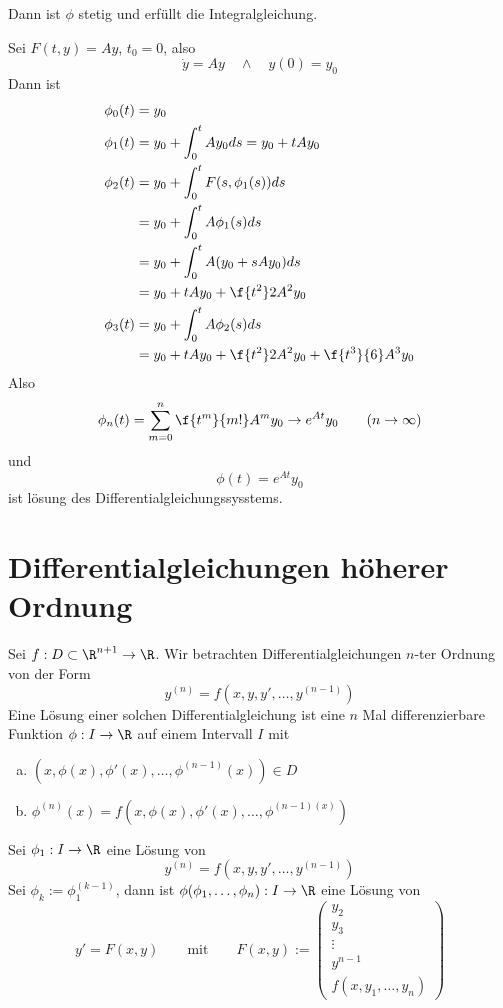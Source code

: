 \documentclass{mycourse}
\begin{document}
Dann ist $\phi$ stetig und erfüllt die Integralgleichung.


\begin{ex*}
	Sei $F(t,y) = Ay$, $t_0=0$, also
	\[
		\dot y = Ay \quad \land \quad y(0) = y_0
	\]
	Dann ist
	\begin{align*}
		\phi_0(t) &= y_0\\
		\phi_1(t) &= y_0 + \int_0^t Ay_0 ds = y_0 + tAy_0\\
		\phi_2(t) &= y_0 + \int_0^t F(s,\phi_1(s)) ds \\
							  &= y_0 + \int_0^t A\phi_1(s) ds\\
					 &=y_0 + \int_0^t A(y_0+sAy_0)ds\\
			   &= y_0 + tAy_0 +\f {t^2}2 A^2y_0\\
		\phi_3(t) &= y_0 + \int_0^t A\phi_2(s) ds\\
									   &= y_0 + tAy_0 + \f{t^2}2 A^2y_0 + \f{t^3}{6} A^3y_0
	\end{align*}
	Also
	\[
		\phi_n(t) = \sum_{m=0}^n\f{t^m}{m!}A^m y_0 \to e^{At}y_0 \qquad (n\to \infty)
	\]
	und
	\[
		\phi(t) = e^{At}y_0
	\]
	ist lösung des Differentialgleichungssysstems.
\end{ex*}


\section{Differentialgleichungen höherer Ordnung}


Sei $f:D\subset \R^{n+1}\to \R$.
Wir betrachten Differentialgleichungen $n$-ter Ordnung von der Form
\[
	y^{(n)} = f(x,y,y',\dotsc,y^{(n-1)})
\]
Eine Lösung einer solchen Differentialgleichung ist eine $n$ Mal differenzierbare Funktion $\phi : I\to \R$ auf einem Intervall $I$ mit
\begin{enumerate}[(a)]
	\item
		$(x,\phi(x),\phi'(x),\dotsc,\phi^{(n-1)}(x)) \in D$
	\item
		$\phi^{(n)}(x) = f(x,\phi(x),\phi'(x), \dotsc, \phi^{(n-1)(x)})$
\end{enumerate}

Sei $\phi_1 : I\to \R$ eine Lösung von
\[
	y^{(n)} = f(x,y,y',\dotsc,y^{(n-1)})
\]
Sei $\phi_k := \phi_1^{(k-1)}$, dann ist $\phi(\phi_1,\dotsc, \phi_n) : I \to \R$ eine Lösung von
\[
	y' = F(x,y) \qquad \text{mit} \qquad F(x,y) := \begin{pmatrix}y_2 \\ y_3 \\\vdots\\ y^{n-1}\\f(x,y_1,\dotsc,y_n)\end{pmatrix}
\]
\end{document}
